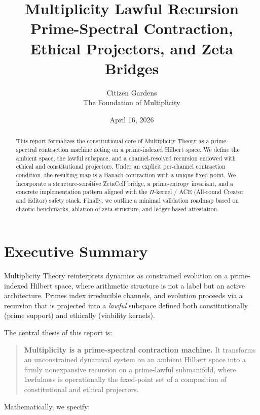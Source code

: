 \documentclass[11pt]{article}
\title{Multiplicity Lawful Recursion\\[4pt]
Prime-Spectral Contraction, Ethical Projectors, and Zeta Bridges}
\author{Citizen Gardens \\ The Foundation of Multiplicity}
\date{April 16, 2026}
\begin{document}
\maketitle

\begin{abstract}
This report formalizes the constitutional core of Multiplicity Theory as a prime-spectral contraction machine acting on a prime-indexed Hilbert space.
We define the ambient space, the lawful subspace, and a channel-resolved recursion endowed with ethical and constitutional projectors.
Under an explicit per-channel contraction condition, the resulting map is a Banach contraction with a unique fixed point.
We incorporate a structure-sensitive ZetaCell bridge, a prime-entropy invariant, and a concrete implementation pattern aligned with the $\Pi$-kernel / ACE (All-round Creator and Editor) safety stack.
Finally, we outline a minimal validation roadmap based on chaotic benchmarks, ablation of zeta-structure, and ledger-based attestation.
\end{abstract}
\newpage
\tableofcontents

\section{Executive Summary}

Multiplicity Theory reinterprets dynamics as constrained evolution on a prime-indexed Hilbert space, where arithmetic structure is not a label but an active architecture.
Primes index irreducible channels, and evolution proceeds via a recursion that is projected into a \emph{lawful} subspace defined both constitutionally (prime support) and ethically (viability kernels).

The central thesis of this report is:

\begin{quote}
\textbf{Multiplicity is a prime-spectral contraction machine.}
It transforms an unconstrained dynamical system on an ambient Hilbert space into a firmly nonexpansive recursion on a prime-lawful submanifold, where lawfulness is operationally the fixed-point set of a composition of constitutional and ethical projectors.
\end{quote}

Mathematically, we specify:
\end{document}
